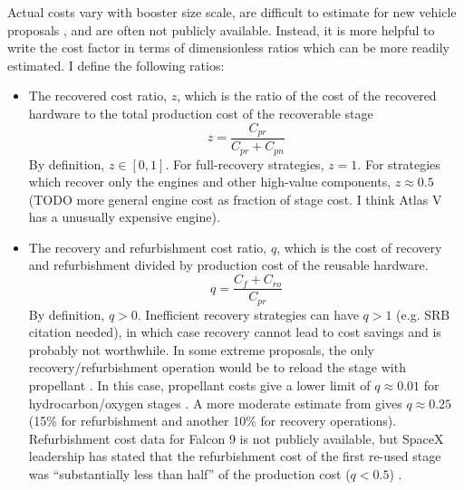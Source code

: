 \documentclass[conf]{new-aiaa}
\begin{document}
Actual costs vary with booster size scale, are difficult to estimate for new vehicle proposals \cite{Sforza2015}, and are often not publicly available. Instead, it is more helpful to write the cost factor in terms of dimensionless ratios which can be more readily estimated. I define the following ratios:
\begin{itemize}
	\item The recovered cost ratio, $z$, which is the ratio of the cost of the recovered hardware to the total production cost of the recoverable stage
    \begin{equation}
    z = \frac{C_{pr}}{C_{pr} + C_{pn}}
    \end{equation}
    By definition, $z \in [0, 1]$. For full-recovery strategies, $z=1$. For strategies which recover only the engines and other high-value components, $z \approx 0.5$ \cite{Ragab2015} (TODO more general engine cost as fraction of stage cost. I think Atlas V has a unusually expensive engine).
    
    \item The recovery and refurbishment cost ratio, $q$, which is the cost of recovery and refurbishment divided by production cost of the reusable hardware.
    \begin{equation}
    q = \frac{C_{f} + C_{ro}}{C_{pr}}
    \end{equation}
    By definition, $q > 0$. Inefficient recovery strategies can have $q > 1$ (e.g. SRB citation needed), in which case recovery cannot lead to cost savings and is probably not worthwhile. In some extreme proposals, the only recovery/refurbishment operation would be to reload the stage with propellant \cite{Musk2017}. In this case, propellant costs give a lower limit of $q \approx 0.01$ for hydrocarbon/oxygen stages \cite{Ragab2015}. A more moderate estimate from \cite{Sforza2015} gives $q \approx 0.25$ (15\% for refurbishment and another 10\% for recovery operations). Refurbishment cost data for Falcon 9 is not publicly available, but SpaceX leadership has stated that the refurbishment cost of the first re-used stage was ``substantially less than half'' of the production cost ($q<0.5$) \cite{Foust2017}.
   

\end{itemize}
\end{document}
